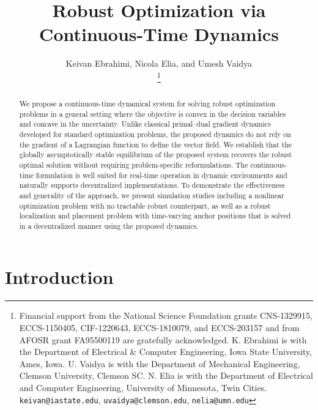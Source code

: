 \documentclass[journal,twoside,web]{ieeecolor}
\title{\LARGE \bf Robust Optimization via Continuous-Time Dynamics}
\author{Keivan Ebrahimi, Nicola Elia, and Umesh Vaidya\\
\thanks{Financial support from the National Science Foundation grants CNS-1329915, ECCS-1150405, CIF-1220643, ECCS-1810079, and ECCS-203157 and from AFOSR grant FA95500119 are gratefully acknowledged. K. Ebrahimi is with the Department of Electrical \& Computer Engineering, Iowa State University, Ames, Iowa. U. Vaidya is with the Department of Mechanical Engineering, Clemson University, Clemson SC.  N. Elia is with the Department of Electrical and Computer Engineering, University of Minnesota, Twin Cities.
{\tt\small keivan@iastate.edu},
{\tt\small uvaidya@clemson.edu},
{\tt\small nelia@umn.edu}
}}
\newcommand{\rev}[1]{\textcolor{revisionblue}{#1}}
\begin{document}
\pagestyle{headings}
\setcounter{page}{1}

\maketitle

\begin{abstract}
\rev{We propose a continuous-time dynamical system for solving robust optimization problems in a general setting where the objective is convex in the decision variables and concave in the uncertainty. Unlike classical primal–dual gradient dynamics developed for standard optimization problems, the proposed dynamics do not rely on the gradient of a Lagrangian function to define the vector field. We establish that the globally asymptotically stable equilibrium of the proposed system recovers the robust optimal solution without requiring problem-specific reformulations. The continuous-time formulation is well suited for real-time operation in dynamic environments and naturally supports decentralized implementations. To demonstrate the effectiveness and generality of the approach, we present simulation studies including a nonlinear optimization problem with no tractable robust counterpart, as well as a robust localization and placement problem with time-varying anchor positions that is solved in a decentralized manner using the proposed dynamics.}
\end{abstract}

\section{Introduction}
\end{document}
